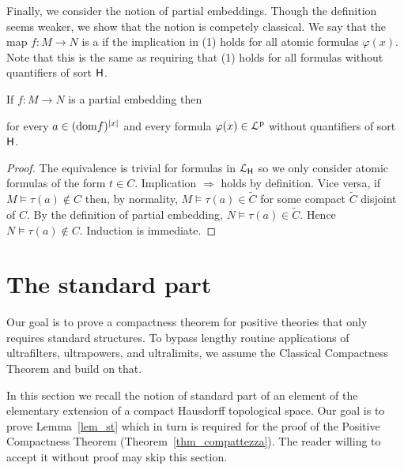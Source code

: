 \documentclass[10pt,oneside]{amsproc}
\renewcommand*{\emph}[1]{%
   \smash{\tikz[baseline]\node[rectangle, fill=teal!25, rounded corners, inner xsep=0.5ex, inner ysep=0.2ex, anchor=base, minimum height = 2.7ex]{\strut #1};}}
\begin{document}
Finally, we consider the notion of partial embeddings.
Though the definition seems weaker, we show that the notion is competely classical.
We say that the map $f:M\to N$ is a \emph{partial embedding\/} if the implication in (1) holds for all atomic formulas $\varphi(x)$.
Note that this is the same as requiring that (1) holds for all formulas without quantifiers of sort ${\sf H}$.

\begin{fact}\label{fact_partial_emb}
  If $f:M\to N$ is a partial embedding then 


  for every $a\in({\rm dom }f)^{|x|}$ and every formula $\varphi(x)\in{\EuScript L}^{\rm p}$ without quantifiers of sort ${\sf H}$.
\end{fact}

\begin{proof}
  The equivalence is trivial for formulas in ${\EuScript L}_{\sf H}$ so we only consider atomic formulas of the form $t\in C$.
  Implication $\Rightarrow$ holds by definition. 
  Vice versa, if $M\models \tau(a)\notin C$ then, by normality,  $M\models \tau(a)\in\tilde{C}$ for some compact $\tilde C$ disjoint of $C$.
  By the definition of partial embedding, $N\models \tau(a)\in\tilde{C}$.
  Hence $N\models \tau(a)\notin C$.
  Induction is immediate.
\end{proof}



\section{The standard part}\label{standard_part}

Our goal is to prove a compactness theorem for positive theories that only requires standard structures.
To bypass lengthy routine applications of ultrafilters, ultrapowers, and ultralimits, %
we assume the Classical Compactness Theorem and build on that.

In this section we recall the notion of standard part of an element of the elementary extension of a compact Hausdorff topological space.
Our goal is to prove Lemma~\ref{lem_st} which in turn is required for the proof of the Positive Compactness Theorem (Theorem~\ref{thm_compattezza}).
The reader willing to accept it without proof may skip this section.
\end{document}
